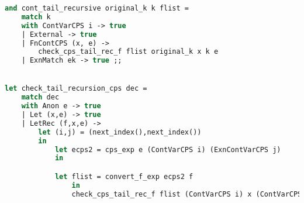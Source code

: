 \begin{lstlisting}[language=Caml, caption=checlTailRecCPS.ml]
and cont_tail_recursive original_k k flist = 
    match k
    with ContVarCPS i -> true
    | External -> true
    | FnContCPS (x, e) -> 
        check_cps_tail_rec_f flist original_k x k e
    | ExnMatch ek -> true ;;


let check_tail_recursion_cps dec =
    match dec
    with Anon e -> true
    | Let (x,e) -> true
    | LetRec (f,x,e) ->
        let (i,j) = (next_index(),next_index()) 
        in
            let ecps2 = cps_exp e (ContVarCPS i) (ExnContVarCPS j) 
            in

            let flist = convert_f_exp ecps2 f
                in
                check_cps_tail_rec_f flist (ContVarCPS i) x (ContVarCPS i) ecps2 ;;
\end{lstlisting}